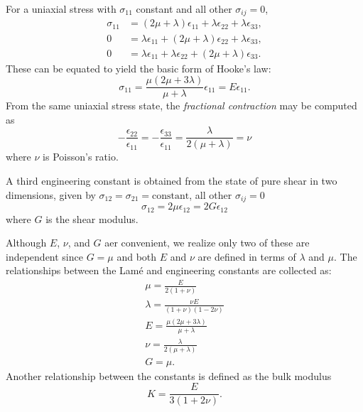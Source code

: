 For a uniaxial stress with $\sigma_{11}$ constant and all other $\sigma_{ij} = 0$,
\begin{align*}
  \sigma_{11} &= \left( 2\mu + \lambda \right)\epsilon_{11} + \lambda \epsilon_{22} + \lambda\epsilon_{33}, \\
  0 &= \lambda \epsilon_{11} + \left( 2\mu + \lambda \right)\epsilon_{22} + \lambda \epsilon_{33}, \\
  0 &= \lambda\epsilon_{11} + \lambda\epsilon_{22} + \left( 2\mu + \lambda \right)\epsilon_{33}
.\end{align*}
These can be equated to yield the basic form of Hooke's law:
\begin{equation*}
  \sigma_{11} = \frac{\mu \left( 2 \mu + 3\lambda \right)}{\mu + \lambda} \epsilon_{11} = E \epsilon_{11}
.\end{equation*}
From the same uniaxial stress state, the \textit{fractional contraction} may be computed as
\begin{equation*}
  - \frac{\epsilon_{22}}{\epsilon_{11}} = - \frac{\epsilon_{33}}{\epsilon_{11}} = \frac{\lambda}{2 \left( \mu + \lambda \right)} = \nu
\end{equation*}
where $\nu$ is Poisson's ratio.

A third engineering constant is obtained from the state of pure shear in two dimensions, given by $\sigma_{12} = \sigma_{21} = \text{constant}$, all other $\sigma_{ij} = 0$
\begin{equation*}
  \sigma_{12} = 2\mu \epsilon_{12} = 2 G \epsilon_{12}
\end{equation*}
where $G$ is the shear modulus.

Although $E$, $\nu$, and $G$ aer convenient, we realize only two of these are independent since $G = \mu$ and both $E$ and $\nu$ are defined in terms of $\lambda$ and $\mu$.
The relationships between the Lamé and engineering constants are collected as:
\begin{gather*}
  \mu = \frac{E}{2 \left( 1 + \nu \right)} \\
  \lambda = \frac{\nu E}{\left( 1 + \nu \right) \left( 1 - 2\nu \right)} \\
  E = \frac{\mu \left( 2\mu + 3\lambda \right)}{\mu + \lambda} \\
  \nu = \frac{\lambda}{2 \left( \mu + \lambda \right)} \\
  G = \mu
.\end{gather*}
Another relationship between the constants is defined as the bulk modulus
\begin{equation*}
  K = \frac{E}{3 \left( 1 + 2\nu \right)}
.\end{equation*}

